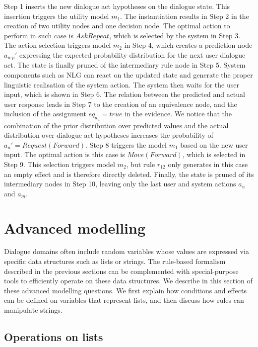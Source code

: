  
Step 1 inserts the new dialogue act hypotheses on the dialogue state.  This insertion triggers 
the utility model $m_1$. The instantiation results in Step 2 in the creation of two utility nodes and one decision node.  The optimal action to perform in such case is $\mathit{AskRepeat}$, which is selected by the system in Step 3. The action selection triggers model $m_2$ in Step 4, which creates a prediction node $a_{u\mbox{-}p}'$ expressing the expected probability distribution for the next user dialogue act. The state is finally pruned of the intermediary rule node in Step 5.  System components such as NLG can react on the updated state and generate the proper linguistic realisation of the system action. The system then waits for the user input, which is shown in Step 6.  The relation between the predicted and actual user response leads in Step 7 to the creation of an equivalence node, and the inclusion of the assignment $eq_{a_u} = true$ in the evidence. We notice that the combination of the prior distribution over predicted values and the actual distribution over dialogue act hypotheses increases the probability of $a_u' = \mathit{Request(Forward)}$. Step 8 triggers the model $m_1$ based on the new user input.  The optimal action is this case is $\mathit{Move(Forward)}$, which is selected in Step 9.  This selection triggers model $m_2$, but rule $r_{12}$ only generates in this case an empty effect and is therefore directly deleted. Finally, the state is pruned of its intermediary nodes in Step 10, leaving only the last user and system actions $a_u$ and $a_m$. 

\section{Advanced modelling}
\label{sec:amodelling}

Dialogue domains often include random variables whose values are expressed via specific data structures such as lists or strings. The rule-based formalism described in the previous sections can be complemented with special-purpose tools to efficiently operate on these data structures.  We describe in this section of these advanced modelling questions.  We first explain how conditions and effects can be defined on variables that represent lists, and then discuss how rules can manipulate strings. 

\subsection{Operations on lists}

